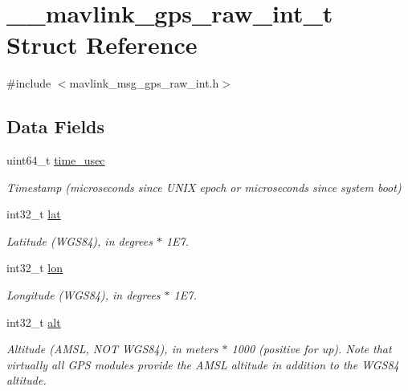 \hypertarget{struct____mavlink__gps__raw__int__t}{\section{\+\_\+\+\_\+mavlink\+\_\+gps\+\_\+raw\+\_\+int\+\_\+t Struct Reference}
\label{struct____mavlink__gps__raw__int__t}
}


{\ttfamily \#include $<$mavlink\+\_\+msg\+\_\+gps\+\_\+raw\+\_\+int.\+h$>$}

\subsection*{Data Fields}
\begin{DoxyCompactItemize}
\item 
uint64\+\_\+t \hyperlink{struct____mavlink__gps__raw__int__t_a39d30393d02f2b1882040e3fa063f6ea}{time\+\_\+usec}
\begin{DoxyCompactList}\small\item\em Timestamp (microseconds since U\+N\+I\+X epoch or microseconds since system boot) \end{DoxyCompactList}\item 
int32\+\_\+t \hyperlink{struct____mavlink__gps__raw__int__t_aefd27d0b2d23c58a59b218aa151220d3}{lat}
\begin{DoxyCompactList}\small\item\em Latitude (W\+G\+S84), in degrees $\ast$ 1\+E7. \end{DoxyCompactList}\item 
int32\+\_\+t \hyperlink{struct____mavlink__gps__raw__int__t_a025fd2dd700ff7180af5a26c2a3497f4}{lon}
\begin{DoxyCompactList}\small\item\em Longitude (W\+G\+S84), in degrees $\ast$ 1\+E7. \end{DoxyCompactList}\item 
int32\+\_\+t \hyperlink{struct____mavlink__gps__raw__int__t_a00fe92144cfdaf8440a841493e5b6e99}{alt}
\begin{DoxyCompactList}\small\item\em Altitude (A\+M\+S\+L, N\+O\+T W\+G\+S84), in meters $\ast$ 1000 (positive for up). Note that virtually all G\+P\+S modules provide the A\+M\+S\+L altitude in addition to the W\+G\+S84 altitude. \end{DoxyCompactList}\item 

\end{DoxyCompactItemize}

